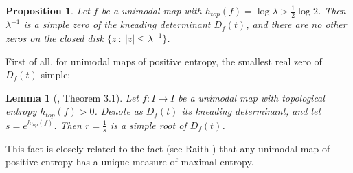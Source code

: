 \documentclass[11pt]{amsart}
\newtheorem{lemma}[theorem]{Lemma}
\newtheorem{proposition}[theorem]{Proposition}
\begin{document}
\begin{proposition} \label{P:no-periph}
Let $f$ be a unimodal map with $h_{top}(f) = \log \lambda> \frac{1}{2} \log 2$. Then $\lambda^{-1}$ is a simple zero of the kneading 
determinant $D_f(t)$,
and there are no other zeros on the closed disk $\{ z \ : \ |z| \leq \lambda^{-1} \}$. 
\end{proposition}

First of all, for unimodal maps of positive entropy, the smallest real zero of $D_f(t)$ simple: 

\begin{lemma}[\cite{Ti}, Theorem 3.1] \label{T:simple}
Let $f : I \to I$ be a unimodal map with topological entropy $h_{top}(f) > 0$.  Denote as $D_f(t)$ its kneading determinant, and let $s = e^{h_{top}(f)}$. Then $r = \frac{1}{s}$ is a simple root of $D_f(t)$.
\end{lemma}

This fact is closely related to the fact (see Raith \cite[Theorem 5]{Ra}) that any unimodal map of positive entropy has a unique measure of maximal entropy. 
\end{document}

